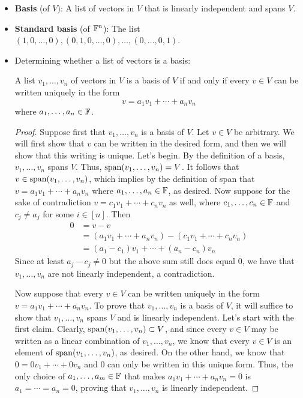 \documentclass[../main.tex]{subfiles}
\begin{document}
\begin{itemize}
    \item \textbf{Basis} (of $V$): A list of vectors in $V$ that is linearly independent and spans $V$.
    \item \textbf{Standard basis} (of $\mathbb{F}^n$): The list $(1,0,\dots,0),(0,1,0,\dots,0),\dots,(0,\dots,0,1)$.
    \item Determining whether a list of vectors is a basis:
    \begin{theorem}
        A list $v_1,\dots,v_n$ of vectors in $V$ is a basis of $V$ if and only if every $v\in V$ can be written uniquely in the form
        \begin{equation*}
            v = a_1v_1+\cdots+a_nv_n
        \end{equation*}
        where $a_1,\dots,a_n\in\mathbb{F}$.
        \begin{proof}
            Suppose first that $v_1,\dots,v_n$ is a basis of $V$. Let $v\in V$ be arbitrary. We will first show that $v$ can be written in the desired form, and then we will show that this writing is unique. Let's begin. By the definition of a basis, $v_1,\dots,v_n$ spans $V$. Thus, $\operatorname{span}(v_1,\dots,v_n)=V$. It follows that $v\in\operatorname{span}(v_1,\dots,v_n)$, which implies by the definition of span that $v=a_1v_1+\cdots+a_nv_n$ where $a_1,\dots,a_n\in\mathbb{F}$, as desired. Now suppose for the sake of contradiction $v=c_1v_1+\cdots+c_nv_n$ as well, where $c_1,\dots,c_n\in\mathbb{F}$ and $c_j\neq a_j$ for some $i\in[n]$. Then
            \begin{align*}
                0 &= v-v\\
                &= (a_1v_1+\cdots+a_nv_n)-(c_1v_1+\cdots+c_nv_n)\\
                &= (a_1-c_1)v_1+\cdots+(a_n-c_n)v_n
            \end{align*}
            Since at least $a_j-c_j\neq 0$ but the above sum still does equal 0, we have that $v_1,\dots,v_n$ are not linearly independent, a contradiction.\par
            Now suppose that every $v\in V$ can be written uniquely in the form $v=a_1v_1+\cdots+a_nv_n$. To prove that $v_1,\dots,v_n$ is a basis of $V$, it will suffice to show that $v_1,\dots,v_n$ spans $V$ and is linearly independent. Let's start with the first claim. Clearly, $\operatorname{span}(v_1,\dots,v_n)\subset V$, and since every $v\in V$ may be written as a linear combination of $v_1,\dots,v_n$, we know that every $v\in V$ is an element of $\operatorname{span}(v_1,\dots,v_n)$, as desired. On the other hand, we know that $0=0v_1+\cdots+0v_n$ and $0$ can only be written in this unique form. Thus, the only choice of $a_1,\dots,a_m\in\mathbb{F}$ that makes $a_1v_1+\cdots+a_nv_n=0$ is $a_1=\cdots=a_n=0$, proving that $v_1,\dots,v_n$ is linearly independent.

\end{proof}
\end{theorem}
\end{itemize}
\end{document}
